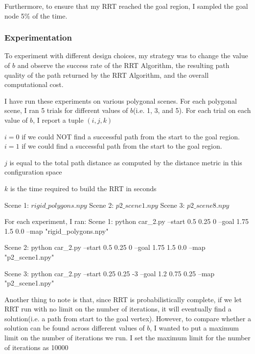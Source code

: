 \documentclass{article}
\begin{document}
Furthermore, to ensure that my RRT reached the goal region, I sampled the goal node 5\% of the time. 

\subsubsection{Experimentation}
To experiment with different design choices, my strategy was to change the value of $b$ and observe the success rate of the RRT Algorithm, the resulting path quality of the path returned by the RRT Algorithm, and the overall computational cost. 

I have run these experiments on various polygonal scenes. For each polygonal scene, I ran 5 trials for different values of $b$(i.e. 1, 3, and 5). For each trial on each value of $b$, I report a tuple $(i, j, k)$ \newline 

$i = 0$ if we could NOT find a successful path from the start to the goal region. $i = 1$ if we could find a successful path from the start to the goal region. \newline 

$j$ is equal to the total path distance as computed by the distance metric in this configuration space \newline 

$k$ is the time required to build the RRT in seconds \newline 

Scene 1: $rigid\_polygons.npy$ \newline 
Scene 2: $p2\_scene1.npy$ \newline 
Scene 3: $p2\_scene8.npy$ \newline 

For each experiment, I ran: \newline 
Scene 1: python car\_2.py --start 0.5 0.25 0 --goal 1.75 1.5 0.0 --map "rigid\_polygons.npy" \newline 

Scene 2: python car\_2.py --start 0.5 0.25 0 --goal 1.75 1.5 0.0 --map "p2\_scene1.npy" \newline

Scene 3: python car\_2.py --start 0.25 0.25 -3 --goal 1.2 0.75 0.25 --map "p2\_scene1.npy" \newline


Another thing to note is that, since RRT is probabilistically complete, if we let RRT run with no limit on the number of iterations, it will eventually find a solution(i.e. a path from start to the goal vertex). However, to compare whether a solution can be found across different values of $b$, I wanted to put a maximum limit on the number of iterations we run. I set the maximum limit for the number of iterations as 10000 
 \newpage 
 
\end{document}
